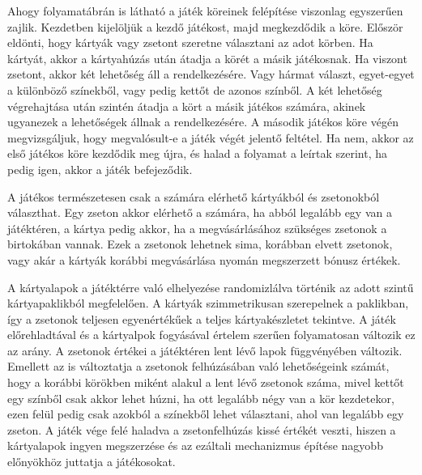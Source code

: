 Ahogy folyamatábrán is látható a játék köreinek felépítése viszonlag egyszerűen zajlik. Kezdetben kijelöljük a kezdő játékost, majd megkezdődik a köre. Először eldönti, hogy kártyák vagy zsetont szeretne választani az adot körben. Ha kártyát, akkor a kártyahúzás után átadja a körét a másik játékosnak. Ha viszont zsetont, akkor két lehetőség áll a rendelkezésére. Vagy hármat választ, egyet-egyet a különböző színekből, vagy pedig kettőt de azonos színből. A két lehetőség végrehajtása után szintén átadja a kört a másik játékos számára, akinek ugyanezek a lehetőségek állnak a rendelkezésére. A második játékos köre végén megvizsgáljuk, hogy megvalósult-e a játék végét jelentő feltétel. Ha nem, akkor az első játékos köre kezdődik meg újra, és halad a folyamat a leírtak szerint, ha pedig igen, akkor a játék befejeződik.\par


A játékos természetesen csak a számára elérhető kártyákból és zsetonokból választhat. Egy zseton akkor elérhető a számára, ha abból legalább egy van a játéktéren, a kártya pedig akkor, ha a megvásárlásához szükséges zsetonok a birtokában vannak. Ezek a zsetonok lehetnek sima, korábban elvett zsetonok, vagy akár a kártyák korábbi megvásárlása nyomán megszerzett bónusz értékek.\par


A kártyalapok a játéktérre való elhelyezése randomizlálva történik az adott szintű kártyapaklikból megfelelően. A kártyák szimmetrikusan szerepelnek a paklikban, így a zsetonok teljesen egyenértékűek a teljes kártyakészletet tekintve. A játék előrehladtával és a kártyalpok fogyásával értelem szerűen folyamatosan változik ez az arány. A zsetonok értékei a játéktéren lent lévő lapok függvényében változik. Emellett az is változtatja a zsetonok felhúzásában való lehetőségeink számát, hogy a korábbi körökben miként alakul a lent lévő zsetonok száma, mivel kettőt egy színből csak akkor lehet húzni, ha ott legalább négy van a kör kezdetekor, ezen felül pedig csak azokból a színekből lehet választani, ahol van legalább egy zseton. A játék vége felé haladva a zsetonfelhúzás kissé értékét veszti, hiszen a kártyalapok ingyen megszerzése és az ezáltali mechanizmus építése nagyobb előnyökhöz juttatja a játékosokat.

